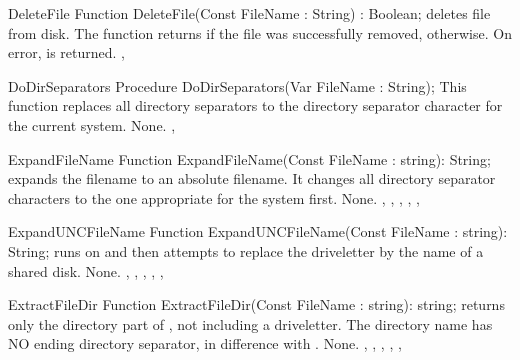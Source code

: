 \begin{function}{DeleteFile}
\Declaration
Function DeleteFile(Const FileName : String) : Boolean;
\Description
{} deletes file  from disk. The function
returns  if the file was successfully removed, 
otherwise.
\Errors
On error,  is returned.
\SeeAlso
{}, 
\end{function}



\begin{procedure}{DoDirSeparators}
\Declaration
Procedure DoDirSeparators(Var FileName : String);
\Description
This function replaces all directory separators 
to the directory separator character for the current system.
\Errors
None.
\SeeAlso
{}, 
\end{procedure}



\begin{function}{ExpandFileName}
\Declaration
Function ExpandFileName(Const FileName : string): String;
\Description
{} expands the filename to an absolute filename.
It changes all directory separator characters to the one appropriate for the
system first.
\Errors
None.
\SeeAlso
{}, , ,
, , 
\end{function}




\begin{function}{ExpandUNCFileName}
\Declaration
Function ExpandUNCFileName(Const FileName : string): String;
\Description
{} runs  on 
and then attempts to replace the driveletter by the name of a shared disk.
\Errors
None.
\SeeAlso
{}, , ,
, , 
\end{function}


\begin{function}{ExtractFileDir}
\Declaration
Function ExtractFileDir(Const FileName : string): string;
\Description
{} returns only the directory part of ,
not including a driveletter. The directory name has NO ending directory
separator, in difference with .
\Errors
None.
\SeeAlso
{}, , ,
, , 
\end{function}

